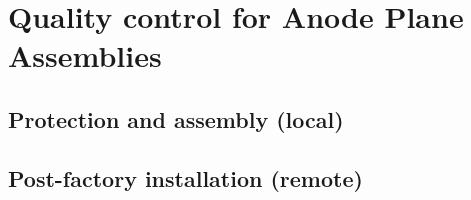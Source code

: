 \chapter{Quality control for Anode Plane Assemblies}
\label{ch:fdsp-apa-qc}

\section{Protection and assembly (local)}
\label{sec:fdsp-apa-qc-local}


\section{Post-factory installation (remote)}
\label{sec:fdsp-apa-qc-remote}






